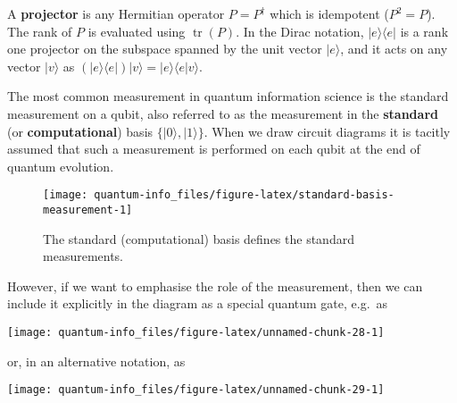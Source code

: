 \documentclass[fleqn]{article}
\newenvironment{idea}{\noindent}{\medskip}
\begin{document}
\begin{idea}

A \textbf{projector} is any Hermitian operator \(P=P^\dagger\) which is idempotent (\(P^2=P\)).
The rank of \(P\) is evaluated using \(\operatorname{tr}(P)\).
In the Dirac notation, \(|e\rangle\langle e|\) is a rank one projector on the subspace spanned by the unit vector \(|e\rangle\), and it acts on any vector \(|v\rangle\) as \((|e\rangle\langle e|)|v\rangle = |e\rangle\langle e|v\rangle\).

\end{idea}

The most common measurement in quantum information science is the standard measurement on a qubit, also referred to as the measurement in the \textbf{standard} (or \textbf{computational}) basis \(\{|0\rangle,|1\rangle\}\).
When we draw circuit diagrams it is tacitly assumed that such a measurement is performed on each qubit at the end of quantum evolution.

\begin{figure}[H]

{\centering \texttt{[image: quantum-info\_files/figure-latex/standard-basis-measurement-1]} 

}

\caption{The standard (computational) basis defines the standard measurements.}\label{fig:standard-basis-measurement}
\end{figure}

However, if we want to emphasise the role of the measurement, then we can include it explicitly in the diagram as a special quantum gate, e.g.~as

\begin{center}\texttt{[image: quantum-info\_files/figure-latex/unnamed-chunk-28-1]} \end{center}

or, in an alternative notation, as

\begin{center}\texttt{[image: quantum-info\_files/figure-latex/unnamed-chunk-29-1]} \end{center}
\end{document}
